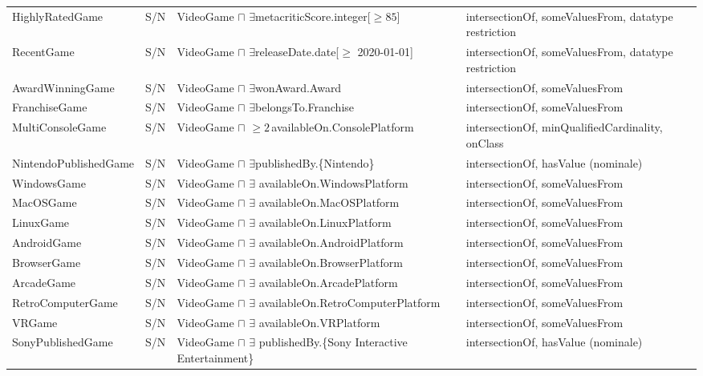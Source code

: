 \begin{longtable}{ll>{\raggedright\arraybackslash}p{6.4cm}>{\raggedright\arraybackslash}p{3.4cm}}
HighlyRatedGame     & S/N & VideoGame $\sqcap$ $\exists$metacriticScore.integer[$\geq 85$] & intersectionOf, someValuesFrom, datatype restriction \\
RecentGame          & S/N & VideoGame $\sqcap$ $\exists$releaseDate.date[$\geq$ 2020-01-01] & intersectionOf, someValuesFrom, datatype restriction \\
AwardWinningGame    & S/N & VideoGame $\sqcap$ $\exists$wonAward.Award                 & intersectionOf, someValuesFrom \\
FranchiseGame       & S/N & VideoGame $\sqcap$ $\exists$belongsTo.Franchise            & intersectionOf, someValuesFrom \\
MultiConsoleGame    & S/N & VideoGame $\sqcap$ $\geq2$\,availableOn.ConsolePlatform & intersectionOf, minQualifiedCardinality, onClass \\
NintendoPublishedGame & S/N & VideoGame $\sqcap$ $\exists$publishedBy.\{Nintendo\}   & intersectionOf, hasValue (nominale) \\
WindowsGame           & S/N & VideoGame $\sqcap$ $\exists$ availableOn.WindowsPlatform & intersectionOf, someValuesFrom \\
MacOSGame             & S/N & VideoGame $\sqcap$ $\exists$ availableOn.MacOSPlatform & intersectionOf, someValuesFrom \\
LinuxGame             & S/N & VideoGame $\sqcap$ $\exists$ availableOn.LinuxPlatform & intersectionOf, someValuesFrom \\
AndroidGame           & S/N & VideoGame $\sqcap$ $\exists$ availableOn.AndroidPlatform & intersectionOf, someValuesFrom \\
BrowserGame           & S/N & VideoGame $\sqcap$ $\exists$ availableOn.BrowserPlatform & intersectionOf, someValuesFrom \\
ArcadeGame            & S/N & VideoGame $\sqcap$ $\exists$ availableOn.ArcadePlatform & intersectionOf, someValuesFrom \\
RetroComputerGame     & S/N & VideoGame $\sqcap$ $\exists$ availableOn.RetroComputerPlatform & intersectionOf, someValuesFrom \\
VRGame                & S/N & VideoGame $\sqcap$ $\exists$ availableOn.VRPlatform & intersectionOf, someValuesFrom \\
SonyPublishedGame     & S/N & VideoGame $\sqcap$ $\exists$ publishedBy.\{Sony Interactive Entertainment\} & intersectionOf, hasValue (nominale) \\

\end{longtable}
